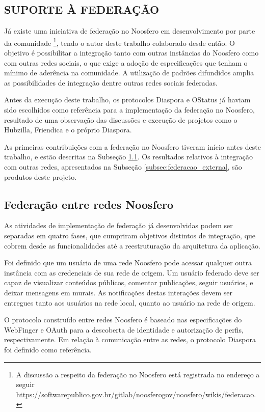 \begin{apendicesenv}
\chapter{SUPORTE À FEDERAÇÃO}

Já existe uma iniciativa de federação no Noosfero em desenvolvimento por parte da
comunidade \footnote{A discussão a respeito da federação no Noosfero está registrada
no endereço a seguir
\url{https://softwarepublico.gov.br/gitlab/noosferogov/noosfero/wikis/federacao}.},
tendo o autor deste trabalho colaborado desde então. O objetivo é possibilitar a
integração tanto com outras instâncias do Noosfero como com outras redes sociais, o
que exige a adoção de especificações que tenham o mínimo de aderência na comunidade.
A utilização de padrões difundidos amplia as possibilidades de integração dentre
outras redes sociais federadas.

Antes da execução deste trabalho, os protocolos Diaspora e OStatus já haviam sido
escolhidos como referência para a implementação da federação no Noosfero, resultado
de uma observação das discussões e execução de projetos como o Hubzilla, Friendica e
o próprio Diaspora.

As primeiras contribuições com a federação no Noosfero tiveram início antes deste
trabalho, e estão descritas na Subseção \ref{subsec:federacao_noosfero}. Os
resultados relativos à integração com outras redes, apresentados na Subseção
\ref{subsec:federacao_externa}, são produtos deste projeto.


\section{Federação entre redes Noosfero}
\label{subsec:federacao_noosfero}

As atividades de implementação de federação já desenvolvidas podem ser separadas em
quatro fases, que cumpriram objetivos distintos de integração, que cobrem desde as
funcionalidades até a reestruturação da arquitetura da aplicação.

Foi definido que um usuário de uma rede Noosfero pode acessar qualquer outra
instância com as credenciais de sua rede de origem. Um usuário federado deve ser
capaz de visualizar conteúdos públicos, comentar publicações, seguir usuários, e
deixar mensagens em murais. As notificações destas interações devem ser entregues
tanto aos usuários na rede local, quanto ao usuário na rede de origem.

O protocolo construído entre redes Noosfero é baseado nas especificações do
WebFinger e OAuth para a descoberta de identidade e autorização de perfis,
respectivamente. Em relação à comunicação entre as redes, o protocolo Diaspora foi
definido como referência.


\end{apendicesenv}
